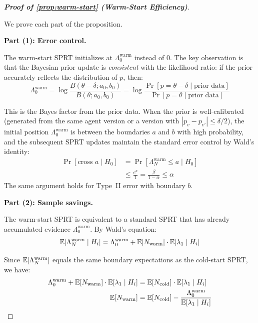 \begin{proof}[\textbf{Proof of \cref{prop:warm-start} (Warm-Start Efficiency)}]
\label{app:proof:warm-start}

We prove each part of the proposition.

\textbf{Part (1): Error control.}

The warm-start SPRT initializes at $\Lambda_0^{\mathrm{warm}}$ instead
of $0$. The key observation is that the Bayesian prior update is
\emph{consistent} with the likelihood ratio: if the prior accurately
reflects the distribution of $p$, then:
\begin{equation}
  \Lambda_0^{\mathrm{warm}} =
    \log\frac{B(\theta - \delta; a_0, b_0)}{B(\theta; a_0, b_0)}
  = \log\frac{\Pr[p = \theta - \delta \mid \text{prior data}]}
             {\Pr[p = \theta \mid \text{prior data}]}
\end{equation}

This is the Bayes factor from the prior data. When the prior is
well-calibrated (generated from the same agent version or a version
with $|p_v - p_{v'}| \leq \delta/2$), the initial position
$\Lambda_0^{\mathrm{warm}}$ is between the boundaries $a$ and $b$
with high probability, and the subsequent SPRT updates maintain the
standard error control by Wald's identity:
\begin{align}
  \Pr[\text{cross } a \mid H_0]
  &= \Pr[\Lambda_N^{\mathrm{warm}} \leq a \mid H_0] \\
  &\leq \frac{e^a}{1} = \frac{\beta}{1-\alpha} \leq \alpha
\end{align}
The same argument holds for Type~II error with boundary $b$.

\textbf{Part (2): Sample savings.}

The warm-start SPRT is equivalent to a standard SPRT that has already
accumulated evidence $\Lambda_0^{\mathrm{warm}}$. By Wald's equation:
\begin{equation}
  \mathbb{E}[\Lambda_N^{\mathrm{warm}} \mid H_i] =
    \Lambda_0^{\mathrm{warm}} + \mathbb{E}[N_{\mathrm{warm}}] \cdot
    \mathbb{E}[\lambda_1 \mid H_i]
\end{equation}

Since $\mathbb{E}[\Lambda_N^{\mathrm{warm}}]$ equals the same boundary
expectations as the cold-start SPRT, we have:
\begin{align}
  \Lambda_0^{\mathrm{warm}} + \mathbb{E}[N_{\mathrm{warm}}] \cdot
    \mathbb{E}[\lambda_1 \mid H_i]
  &= \mathbb{E}[N_{\mathrm{cold}}] \cdot \mathbb{E}[\lambda_1 \mid H_i] \\
  \mathbb{E}[N_{\mathrm{warm}}]
  &= \mathbb{E}[N_{\mathrm{cold}}] -
    \frac{\Lambda_0^{\mathrm{warm}}}{\mathbb{E}[\lambda_1 \mid H_i]}
\end{align}


\end{proof}
